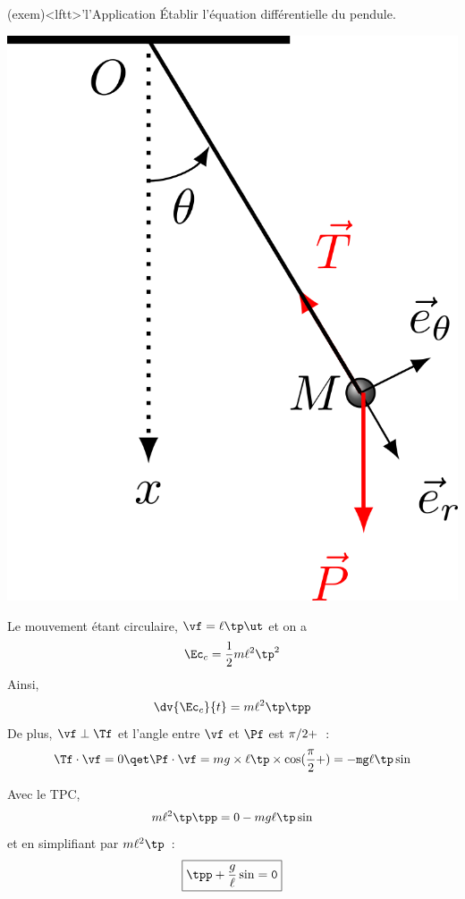 \documentclass[../../main/main.tex]{subfiles}
\begin{document}
\begin{tcb*}(exem)<lftt>'l'{Application}
	Établir l'équation différentielle du pendule.
	\tcblower
	\begin{minipage}{0.25\linewidth}
		\begin{center}
			\includegraphics[width=\linewidth]{pendule_plain}
		\end{center}
	\end{minipage}
	\hfill
	\begin{minipage}{0.70\linewidth}
		Le mouvement étant circulaire, $\vf = \ell\tp\ut$ et on a
		\[\Ec_c = \frac{1}{2}m\ell^2\tp^2\]
		Ainsi,
		\[\dv{\Ec_c}{t} = m\ell^2\tp\tpp\]
		De plus, $\vf\perp\Tf$ et l'angle entre $\vf$ et $\Pf$ est $\pi/2+\tt$~:
		\[
			\Tf\cdot\vf = 0
			\qet
			\Pf\cdot\vf = mg\times\ell\tp\times\cos(\frac{\pi}{2}+\tt) =
			-mg\ell\tp\sin\tt
		\]
	\end{minipage}
	Avec le TPC,
	\[m\ell^2\tp\tpp = 0 - mg\ell\tp\sin\tt\]
	et en simplifiant par $m\ell^2\tp$~:
	\[\boxed{\tpp + \frac{g}{\ell}\sin\tt = 0}\]
\end{tcb*}
\end{document}
